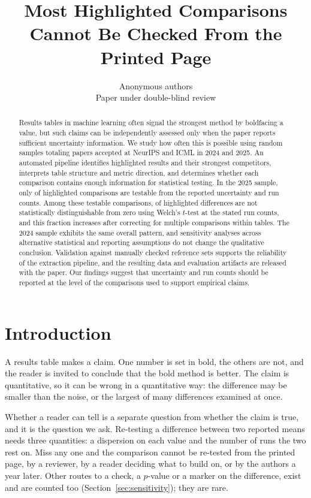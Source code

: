 \documentclass{article}
\title{Most Highlighted Comparisons Cannot Be Checked From the Printed Page}
\author{Anonymous authors\\Paper under double-blind review}
\begin{document}
\maketitle

\begin{abstract}
Results tables in machine learning often signal the strongest method by boldfacing a value, but such claims can be independently assessed only when the paper reports sufficient uncertainty information. We study how often this is possible using random samples totaling \nPapersTotal{} papers accepted at NeurIPS and ICML in 2024 and 2025. An automated pipeline identifies highlighted results and their strongest competitors, interprets table structure and metric direction, and determines whether each comparison contains enough information for statistical testing. In the 2025 sample, only \nPctTestable{} of highlighted comparisons are testable from the reported uncertainty and run counts. Among these testable comparisons, \nPctFail{} of highlighted differences are not statistically distinguishable from zero using Welch's $t$-test at the stated run counts, and this fraction increases after correcting for multiple comparisons within tables. The 2024 sample exhibits the same overall pattern, and sensitivity analyses across alternative statistical and reporting assumptions do not change the qualitative conclusion. Validation against manually checked reference sets supports the reliability of the extraction pipeline, and the resulting data and evaluation artifacts are released with the paper. Our findings suggest that uncertainty and run counts should be reported at the level of the comparisons used to support empirical claims.
\end{abstract}

\section{Introduction}
\label{sec:intro}

A results table makes a claim. One number is set in bold, the others are not,
and the reader is invited to conclude that the bold method is better. The claim
is quantitative, so it can be wrong in a quantitative way: the difference may be
smaller than the noise, or the largest of many differences examined at once.

Whether a reader can tell is a separate question from whether the claim is true,
and it is the question we ask. Re-testing a difference between two reported
means needs three quantities: a dispersion on each value and the number of
runs the two rest on. Miss any one and the comparison cannot be re-tested from
the printed page, by a reviewer, by a reader deciding what to build on, or by
the authors a year later. Other routes to a check, a $p$-value or a marker on
the difference, exist and are counted too (Section~\ref{sec:sensitivity});
they are rare.
\end{document}
